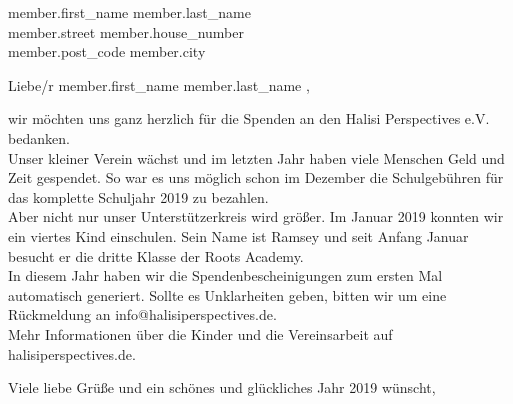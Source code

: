 \documentclass[
               DIV=15,
               fontsize=10pt,
               parskip=half,
               enlargefirstpage=true,
               fromalign=right,
               fromrule=afteraddress,
               fromlogo,
              ]{scrlttr2}
\begin{document}
\begin{letter}{ {{ member.first_name }} {{ member.last_name }} \\
                {{ member.street }} {{ member.house_number }} \\
                {{ member.post_code }} {{ member.city }} }

\opening{Liebe/r {{ member.first_name }} {{ member.last_name }},}
wir möchten uns ganz herzlich für die Spenden an den Halisi Perspectives e.V. bedanken.\\

Unser kleiner Verein wächst und im letzten Jahr haben viele Menschen Geld und Zeit gespendet. So war es uns möglich schon im Dezember die Schulgebühren für das komplette Schuljahr 2019 zu bezahlen.\\

Aber nicht nur unser Unterstützerkreis wird größer. Im Januar 2019 konnten wir ein viertes Kind einschulen. Sein Name ist Ramsey und seit Anfang Januar besucht er die dritte Klasse der Roots Academy.\\

In diesem Jahr haben wir die Spendenbescheinigungen zum ersten Mal automatisch generiert. Sollte es Unklarheiten geben, bitten wir um eine Rückmeldung an info@halisiperspectives.de.\\

Mehr Informationen über die Kinder und die Vereinsarbeit auf halisiperspectives.de.\\

\closing{Viele liebe Grüße und ein schönes und glückliches Jahr 2019 wünscht,}

\end{letter}
\end{document}
